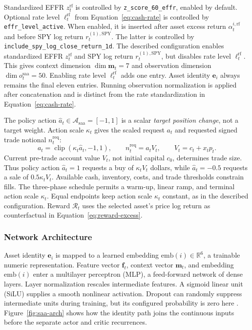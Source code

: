 Standardized EFFR \(z_t^{\mathrm{rf}}\) is controlled by \texttt{z\_score\_60\_effr}, enabled by default. Optional rate level \(\ell_t^{\mathrm{rf}}\) from Equation~\eqref{eq:cash-rate} is controlled by \texttt{effr\_level\_active}. When enabled, it is inserted after asset excess return \(\alpha_t^{i,\mathrm{rf}}\) and before SPY log return \(r_t^{(1),\mathrm{SPY}}\). The latter is controlled by \texttt{include\_spy\_log\_close\_return\_1d}. The described configuration enables standardized EFFR \(z_t^{\mathrm{rf}}\) and SPY log return \(r_t^{(1),\mathrm{SPY}}\), but disables rate level \(\ell_t^{\mathrm{rf}}\). This gives context dimension \(\dim\mathbf m_t=7\) and observation dimension \(\dim o_t^{\mathrm{saa}}=50\). Enabling rate level \(\ell_t^{\mathrm{rf}}\) adds one entry. Asset identity \(\mathbf e_i\) always remains the final eleven entries. Running observation normalization is applied after concatenation and is distinct from the rate standardization in Equation~\eqref{eq:cash-rate}.

The policy action \(\hat a_t\in\mathcal A_{\mathrm{saa}}=[-1,1]\) is a scalar \emph{target position change}, not a target weight. Action scale \(\kappa_t\) gives the scaled request \(a_t\) and requested signed trade notional \(n_t^{\mathrm{req}}\):
\begin{equation}
a_t=\operatorname{clip}(\kappa_t\hat a_t,-1,1),\qquad
n_t^{\mathrm{req}}=a_tV_t,\qquad V_t=c_t+x_tp_t.
\label{eq:saa-action}
\end{equation}
Current pre-trade account value \(V_t\), not initial capital \(c_0\), determines trade size. Thus policy action \(\hat a_t=1\) requests a buy of \(\kappa_tV_t\) dollars, while \(\hat a_t=-0.5\) requests a sale of \(0.5\kappa_tV_t\). Available cash, inventory, costs, and trade thresholds constrain fills. The three-phase schedule permits a warm-up, linear ramp, and terminal action scale \(\kappa_t\). Equal endpoints keep action scale \(\kappa_t\) constant, as in the described configuration. Reward \(\mathcal R_t\) uses the selected asset's price log return as counterfactual in Equation~\eqref{eq:reward-excess}.

\subsubsection{Network Architecture}

Asset identity \(\mathbf e_i\) is mapped to a learned embedding \(\mathrm{emb}(i)\in\mathbb R^6\), a trainable numeric representation. Feature vector \(\mathbf f_t\), context vector \(\mathbf m_t\), and embedding \(\mathrm{emb}(i)\) enter a multilayer perceptron (MLP), a feed-forward network of dense layers. Layer normalization rescales intermediate features. A sigmoid linear unit (SiLU) supplies a smooth nonlinear activation. Dropout can randomly suppress intermediate units during training, but its configured probability is zero here \cite{Goodfellow-et-al-2016}. Figure~\ref{fig:saa-arch} shows how the identity path joins the continuous inputs before the separate actor and critic recurrences.

